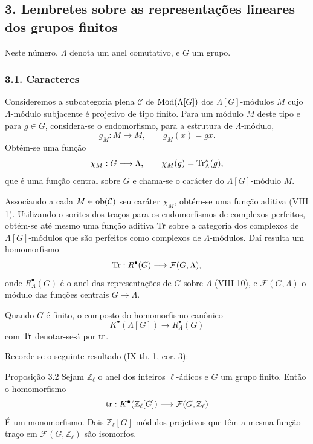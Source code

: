 \subsection*{3. Lembretes sobre as representações lineares dos grupos finitos}

Neste número, $\Lambda$ denota um anel comutativo, e $G$ um grupo.

\subsubsection*{3.1. Caracteres}

Consideremos a subcategoria plena $\mathcal C$ de $\operatorname{Mod}(\Lambda[G])$ dos $\Lambda[G]$-módulos $M$ cujo $\Lambda$-módulo subjacente é projetivo de tipo finito. Para um módulo $M$ deste tipo e para $g\in G$, considera-se o endomorfismo, para a estrutura de $\Lambda$-módulo,
\[
g_M:M\longrightarrow M,
\qquad g_M(x)=gx.
\]
Obtém-se uma função
\[
\chi_M:G\longrightarrow \Lambda,
\qquad \chi_M(g)=\operatorname{Tr}^*_\Lambda(g),
\]
que é uma função central sobre $G$ e chama-se o carácter do $\Lambda[G]$-módulo $M$.

Associando a cada $M\in\operatorname{ob}(\mathcal C)$ seu caráter $\chi_M$, obtém-se uma função aditiva (VIII 1). Utilizando o sorites dos traços para os endomorfismos de complexos perfeitos, obtém-se até mesmo uma função aditiva $\operatorname{Tr}$ sobre a categoria dos complexos de $\Lambda[G]$-módulos que são perfeitos como complexos de $\Lambda$-módulos. Daí resulta um homomorfismo
\[
\operatorname{Tr}:R^{\bullet}(G)\longrightarrow \mathcal F(G,\Lambda),
\]
onde $R^{\bullet}_{\Lambda}(G)$ é o anel das representações de $G$ sobre $\Lambda$ (VIII 10), e $\mathcal F(G,\Lambda)$ o módulo das funções centrais $G\to\Lambda$.

Quando $G$ é finito, o composto do homomorfismo canônico
\[
K^{\bullet}(\Lambda[G])\longrightarrow R^{\bullet}_{\Lambda}(G)
\]
com $\operatorname{Tr}$ denotar-se-á por $\operatorname{tr}$.

Recorde-se o seguinte resultado (IX th. 1, cor. 3):

\begin{statement}{Proposição 3.2}
Sejam $\mathbb Z_\ell$ o anel dos inteiros $\ell$-ádicos e $G$ um grupo finito. Então o homomorfismo
\[
\operatorname{tr}:K^{\bullet}(\mathbb Z_\ell[G])\longrightarrow \mathcal F(G,\mathbb Z_\ell)
\]
É um monomorfismo. Dois $\mathbb Z_\ell[G]$-módulos projetivos que têm a mesma função traço em $\mathcal F(G,\mathbb Z_\ell)$ são isomorfos.
\end{statement}
